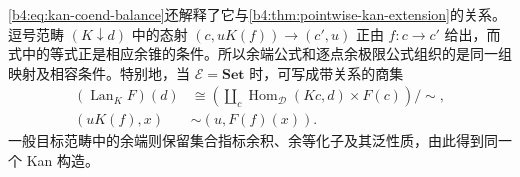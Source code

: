 \eqref{b4:eq:kan-coend-balance}还解释了它与\cref{b4:thm:pointwise-kan-extension}的关系。逗号范畴 \((K\downarrow d)\) 中的态射 \((c,uK(f))\rightarrow(c',u)\) 正由 \(f:c\rightarrow c'\) 给出，而式中的等式正是相应余锥的条件。所以余端公式和逐点余极限公式组织的是同一组映射及相容条件。特别地，当 \(\mathcal E=\mathbf{Set}\) 时，可写成带关系的商集
\[
	\begin{aligned}
		(\operatorname{Lan}_KF)(d)
		&\cong
		\left(\coprod_c\operatorname{Hom}_{\mathcal D}(Kc,d)\times F(c)\right)\big/\!\sim,\\
		(uK(f),x)&\sim(u,F(f)(x)).
	\end{aligned}
\]
一般目标范畴中的余端则保留集合指标余积、余等化子及其泛性质，由此得到同一个 Kan 构造。

